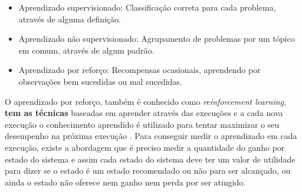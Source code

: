\begin{itemize}
	\item Aprendizado supervisionado: Classificação correta para cada problema, através de alguma definição. 
	\item Aprendizado não supervisionado: Agrupamento de problemas por um tópico em comum, através de algum padrão.
	\item Aprendizado por reforço: Recompensas ocasionais, aprendendo por observações bem sucedidas ou mal sucedidas. 
\end{itemize}

O aprendizado por reforço, também é conhecido como \textit{reinforcement learning}, \textbf{tem as técnicas } baseadas em  aprender através das execuções e a cada nova execução o conhecimento aprendido é utilizado para tentar maximizar o seu desempenho na próxima execução \cite{intelligence2003modern}. Para conseguir medir o aprendizado em cada execução, existe a abordagem que é preciso medir a quantidade do ganho por estado do sistema e assim cada estado do sistema deve ter um valor de utilidade para dizer se o estado é um estado recomendado ou não para ser alcançado, ou ainda o estado não oferece nem ganho nem perda por ser atingido. 



